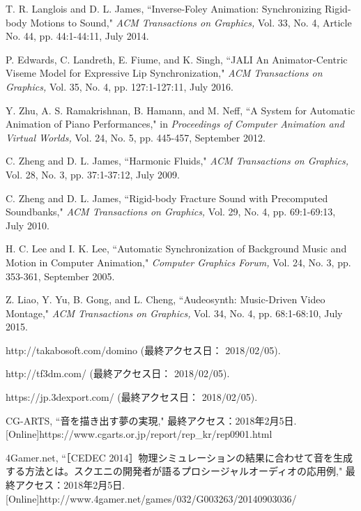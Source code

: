 \renewcommand{\refname}{参考文献}	
%
\begin{thebibliography}{55}
%
T. R. Langlois and D. L. James,
 ``Inverse-Foley Animation: Synchronizing Rigid-body Motions to Sound,"
  \textit{ACM Transactions on Graphics,} Vol. 33, No. 4, Article No. 44, pp. 44:1-44:11, July 2014.

P. Edwards, C. Landreth, E. Fiume, and K. Singh,
 ``JALI An Animator-Centric Viseme Model for Expressive Lip Synchronization,"
  \textit{ACM Transactions on Graphics,} Vol. 35, No. 4, pp. 127:1-127:11, July 2016.

Y. Zhu, A. S. Ramakrishnan, B. Hamann, and M. Neff,
 ``A System for Automatic Animation of Piano Performances,"
  in \textit{Proceedings of Computer Animation and Virtual Worlds,} Vol. 24, No. 5, pp. 445-457, September 2012.

C. Zheng and D. L. James,
 ``Harmonic Fluids,"
\textit{ACM Transactions on Graphics,} Vol. 28, No. 3, pp. 37:1-37:12, July 2009.

C. Zheng and D. L. James,
 ``Rigid-body Fracture Sound with Precomputed Soundbanks,"
\textit{ACM Transactions on Graphics,} Vol. 29, No. 4, pp. 69:1-69:13, July 2010.

H. C. Lee and I. K. Lee,
``Automatic Synchronization of Background Music and Motion in Computer Animation,"
\textit{Computer Graphics Forum,} Vol. 24, No. 3, pp. 353-361, September 2005.

Z. Liao, Y. Yu, B. Gong, and L. Cheng,
 ``Audeosynth: Music-Driven Video Montage,"
\textit{ACM Transactions on Graphics,} Vol. 34, No. 4, pp. 68:1-68:10, July 2015.

http://takabosoft.com/domino
(最終アクセス日： 2018/02/05).

http://tf3dm.com/
(最終アクセス日： 2018/02/05).

https://jp.3dexport.com/
(最終アクセス日： 2018/02/05).

CG-ARTS, ``音を描き出す夢の実現," 最終アクセス：2018年2月5日.
 [Online]https://www.cgarts.or.jp/report/rep\_kr/rep0901.html

4Gamer.net,
 ``［CEDEC 2014］物理シミュレーションの結果に合わせて音を生成する方法とは。スクエニの開発者が語るプロシージャルオーディオの応用例," 最終アクセス：2018年2月5日.
 [Online]http://www.4gamer.net/games/032/G003263/20140903036/

\end{thebibliography}